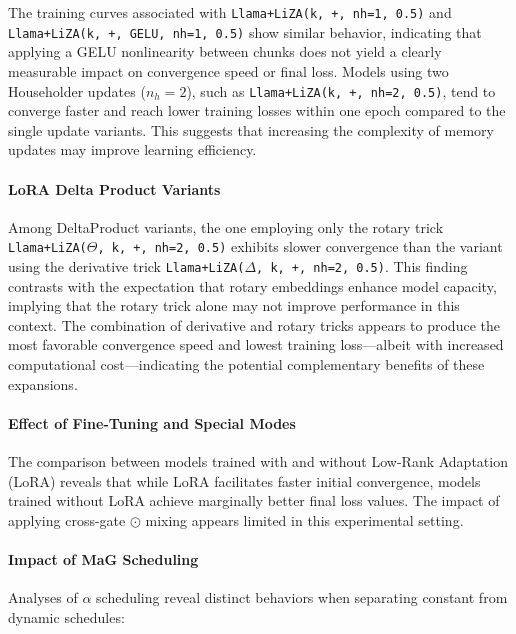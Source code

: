 \documentclass[10pt,a4paper]{article}
\begin{document}
The training curves associated with \texttt{Llama+LiZA(k, +, nh=1, 0.5)} and \texttt{Llama+LiZA(k, +, GELU, nh=1, 0.5)} show similar behavior, indicating that applying a GELU nonlinearity between chunks does not yield a clearly measurable impact on convergence speed or final loss. Models using two Householder updates (\(n_h=2\)), such as \texttt{Llama+LiZA(k, +, nh=2, 0.5)}, tend to converge faster and reach lower training losses within one epoch compared to the single update variants. This suggests that increasing the complexity of memory updates may improve learning efficiency.

\paragraph{LoRA Delta Product Variants}

Among DeltaProduct variants, the one employing only the rotary trick 
\texttt{Llama+LiZA(}\(\Theta\)\texttt{, k, +, nh=2, 0.5)} exhibits slower convergence than the variant using the derivative trick \texttt{Llama+LiZA(}\(\Delta\)\texttt{, k, +, nh=2, 0.5)}. This finding contrasts with the expectation that rotary embeddings enhance model capacity, implying that the rotary trick alone may not improve performance in this context. The combination of derivative and rotary tricks appears to produce the most favorable convergence speed and lowest training loss—albeit with increased computational cost—indicating the potential complementary benefits of these expansions.

\paragraph{Effect of Fine-Tuning and Special Modes}

The comparison between models trained with and without Low-Rank Adaptation (LoRA) reveals that while LoRA facilitates faster initial convergence, models trained without LoRA achieve marginally better final loss values. The impact of applying cross-gate $\odot$ mixing appears limited in this experimental setting.

\paragraph{Impact of MaG Scheduling}

Analyses of \(\alpha\) scheduling reveal distinct behaviors when separating constant from dynamic schedules:
\end{document}
